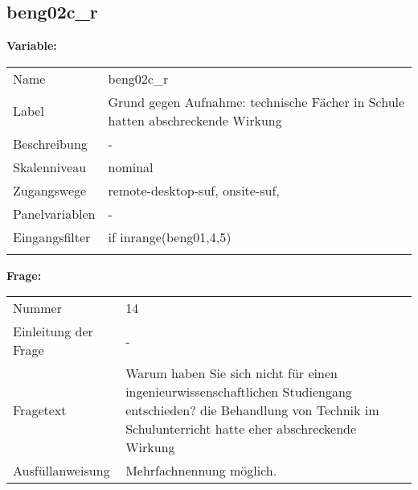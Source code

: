 	
	
	\subsection{beng02c\_r}
	\label{subSection:beng02c_r}

	\noindent\textbf{Variable:}\\
		\begin{tabular}{lL{11.3cm}}
			\label{tableVariable:beng02c_r}
			Name & beng02c\_r \\
			Label & Grund gegen Aufnahme: technische Fächer in Schule hatten abschreckende Wirkung \\
			Beschreibung & - \\
			Skalenniveau & nominal \\
			Zugangswege &
				remote-desktop-suf,
				onsite-suf,
 \\
			Panelvariablen & -
			 \\
			Eingangsfilter & if inrange(beng01,4,5) \\
 \\
		\end{tabular}

		\vspace*{1 cm}
		\noindent\textbf{Frage:}\\
		\begin{tabular}{lL{11.3cm}}
			\label{tableQuestion:beng02c_r}
			Nummer & 14 \\
			Einleitung der Frage & - \\
			Fragetext & Warum haben Sie sich nicht für einen ingenieurwissenschaftlichen Studiengang entschieden?
die Behandlung von Technik im Schulunterricht hatte eher abschreckende Wirkung \\
			Ausfüllanweisung & Mehrfachnennung möglich. \\
		\end{tabular}





